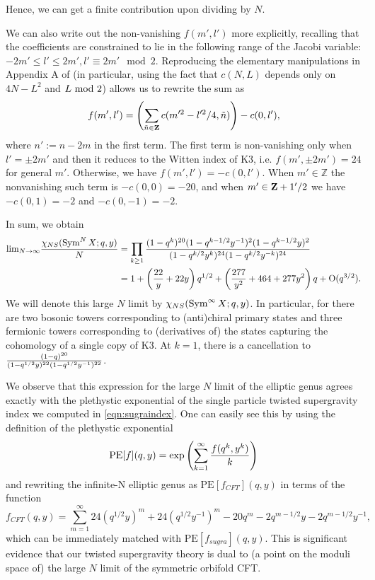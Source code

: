 \documentclass[../main.tex]{subfiles}
\begin{document}
Hence, we can get a finite contribution upon dividing by $N$. 

We can also write out the non-vanishing $f(m', l')$ more explicitly, recalling that the coefficients are constrained to lie in the following range of the Jacobi variable: $-2m' \leq l' \leq 2m', l' \equiv 2 m' \mod 2$. Reproducing the elementary manipulations in Appendix A of \cite{BKKP} (in particular, using the fact that $c(N, L)$ depends only on $4N-L^2$ and $L \ {\rm mod} \ 2$) allows us to rewrite the sum as
\begin{equation}\label{eq:fml1}
f(m', l') = \left( \sum_{\tilde{n} \in \mathbf Z}c(m'^2 - l'^2/4, \tilde{n}) \right) - c(0, l'),
\end{equation} where $n':= n - 2m$ in the first term. 
The first term is non-vanishing only when $l' = \pm 2 m'$ and then it reduces to the Witten index of K3, i.e. $f(m', \pm 2m') = 24$ for general $m'$. Otherwise, we have $f(m', l') = -c(0, l')$. When $m' \in \mathbb{Z}$ the nonvanishing such term is $-c(0, 0) = -20$, and when $m' \in \mathbf Z + 1'/2$ we have $-c(0, 1) = -2$ and $-c(0, -1) = -2$. 

In sum, we obtain
\begin{align}
{\rm lim}_{N \rightarrow \infty}{\chi_{NS}(\operatorname{Sym}^{N} X; q, y) \over N} &= \prod_{k \geq 1}{(1 - q^k)^{20}(1 - q^{k-1/2}y^{-1})^2(1 - q^{k-1/2}y)^2 \over (1 - q^{k/2}y^k)^{24}(1 - q^{k/2}y^{-k})^{24}} \\
&= 1 + \left({22 \over y} + 22 y \right)q^{1/2} + \left({277 \over y^2} + 464 + 277 y^2 \right)q + \text{O}(q^{3/2}).
\end{align} 
We will denote this large $N$ limit by $\chi_{NS}(\operatorname{Sym}^\infty X ; q,y)$. 
In particular, for there are two bosonic towers corresponding to (anti)chiral primary states and three fermionic towers corresponding to (derivatives of) the states capturing the cohomology of a single copy of K3. At $k=1$, there is a cancellation to ${(1 - q)^{20} \over (1 - q^{1/2}y)^{22}(1 - q^{1/2}y^{-1})^{22}}$.

We observe that this expression for the large $N$ limit of the elliptic genus agrees exactly with the plethystic exponential of the single particle twisted supergravity index we computed in \eqref{eqn:sugraindex}. One can easily see this by using the definition of the plethystic exponential 
\begin{equation}
\textrm{PE}[f](q, y) = \textrm{exp}\left(\sum_{k=1}^{\infty}{f(q^k, y^k) \over k}\right)
\end{equation} and rewriting the infinite-N elliptic genus as $\textrm{PE}[f_{CFT}](q, y)$ in terms of the function
\begin{equation}
f_{CFT}(q, y) = \sum_{m=1}^{\infty} 24 (q^{1/2} y)^m + 24 (q^{1/2}y^{-1})^m -20 q^m - 2 q^{m-1/2} y - 2 q^{m-1/2} y^{-1} ,
\end{equation} which can be immediately matched with $\textrm{PE}[f_{sugra}](q, y)$. 
This is significant evidence that our twisted supergravity theory is dual to (a point on the moduli space of) the large $N$ limit of the symmetric orbifold CFT. 
\end{document}
